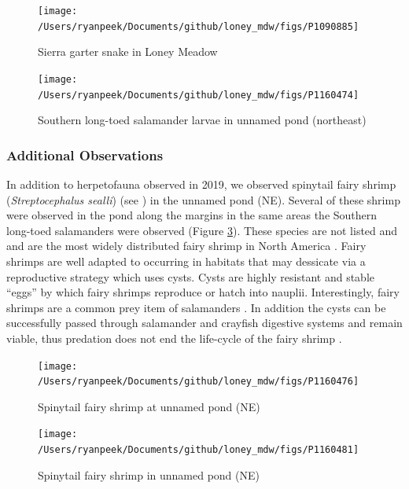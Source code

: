 \documentclass[11pt,a4paper,]{article}
\begin{document}
\begin{figure}

{\centering \texttt{[image: /Users/ryanpeek/Documents/github/loney\_mdw/figs/P1090885]} 

}

\caption{Sierra garter snake in Loney Meadow}\label{fig:fig7}
\end{figure}

\begin{figure}

{\centering \texttt{[image: /Users/ryanpeek/Documents/github/loney\_mdw/figs/P1160474]} 

}

\caption{Southern long-toed salamander larvae in unnamed pond (northeast)}\label{fig:fig8}
\end{figure}

\hypertarget{additional-observations}{%
\subsubsection{Additional Observations}\label{additional-observations}}

In addition to herpetofauna observed in 2019, we observed spinytail fairy shrimp (\emph{Streptocephalus sealli}) (see \textcite{Dexter1956-yl}) in the unnamed pond (NE). Several of these shrimp were observed in the pond along the margins in the same areas the Southern long-toed salamanders were observed (Figure \ref{fig:fig9}). These species are not listed and and are the most widely distributed fairy shrimp in North America \autocite{Eriksen1999-qk}. Fairy shrimps are well adapted to occurring in habitats that may dessicate via a reproductive strategy which uses cysts. Cysts are highly resistant and stable ``eggs'' by which fairy shrimps reproduce or hatch into nauplii. Interestingly, fairy shrimps are a common prey item of salamanders \autocite{Eriksen1999-qk}. In addition the cysts can be successfully passed through salamander and crayfish digestive systems and remain viable, thus predation does not end the life-cycle of the fairy shrimp \autocite{Eriksen1999-qk}.

\begin{figure}

{\centering \texttt{[image: /Users/ryanpeek/Documents/github/loney\_mdw/figs/P1160476]} 

}

\caption{Spinytail fairy shrimp at unnamed pond (NE)}\label{fig:fig9}
\end{figure}

\begin{figure}

{\centering \texttt{[image: /Users/ryanpeek/Documents/github/loney\_mdw/figs/P1160481]} 

}

\caption{Spinytail fairy shrimp in unnamed pond (NE)}\label{fig:fig10}
\end{figure}

\printbibliography
\end{document}
